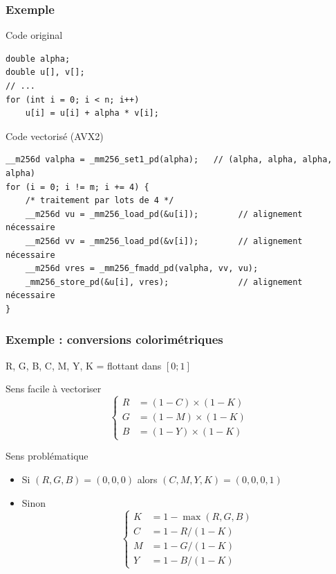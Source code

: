 \documentclass[xcolor={x11names,svgnames}]{beamer}
\begin{document}

\begin{frame}[fragile=singleslide]
  \frametitle{Exemple}

  \begin{block}{Code original}
\begin{verbatim}
double alpha;
double u[], v[];
// ...
for (int i = 0; i < n; i++)
    u[i] = u[i] + alpha * v[i];
\end{verbatim}
\end{block}

\begin{exampleblock}{Code vectorisé (AVX2)}
\begin{verbatim}
__m256d valpha = _mm256_set1_pd(alpha);   // (alpha, alpha, alpha, alpha)
for (i = 0; i != m; i += 4) {
    /* traitement par lots de 4 */
    __m256d vu = _mm256_load_pd(&u[i]);        // alignement nécessaire
    __m256d vv = _mm256_load_pd(&v[i]);        // alignement nécessaire
    __m256d vres = _mm256_fmadd_pd(valpha, vv, vu);
    _mm256_store_pd(&u[i], vres);              // alignement nécessaire
}
  \end{verbatim}
\end{exampleblock}
\end{frame}


\begin{frame}[fragile=singleslide]
  \frametitle{Exemple : conversions colorimétriques}

  R, G, B, C, M, Y, K = flottant dans $[0; 1]$

  \begin{exampleblock}{Sens facile à vectoriser}
  \[
  \left\{
    \begin{array}{rl}
      R &= (1-C) \times (1 - K) \\
      G &= (1-M) \times (1 - K) \\
      B &= (1-Y) \times (1 - K)
    \end{array}
    \right.
\]
\end{exampleblock}

\begin{alertblock}{Sens problématique}
  \begin{itemize}
  \item Si $(R, G, B) = (0, 0, 0)$ alors $(C,M,Y,K) = (0, 0, 0, 1)$
    
  \item Sinon
    \[  \left\{\begin{array}{rl}
      K &= 1 - \max(R, G, B) \\
      C &= 1 - R  / (1 - K) \\
      M &= 1 - G  / (1 - K) \\
      Y &= 1 - B  / (1 - K) 
    \end{array}
    \right.
\]
\end{itemize}


\end{alertblock}
\end{frame}
\end{document}
